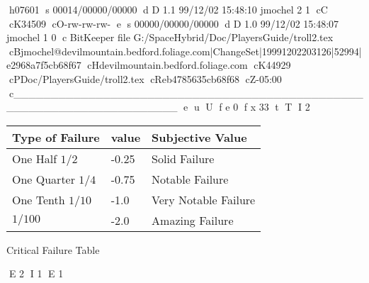 h07601
s 00014/00000/00000
d D 1.1 99/12/02 15:48:10 jmochel 2 1
cC
cK34509
cO-rw-rw-rw-
e
s 00000/00000/00000
d D 1.0 99/12/02 15:48:07 jmochel 1 0
c BitKeeper file G:/SpaceHybrid/Doc/PlayersGuide/troll2.tex
cBjmochel@devilmountain.bedford.foliage.com|ChangeSet|19991202203126|52994|e2968a7f5cb68f67
cHdevilmountain.bedford.foliage.com
cK44929
cPDoc/PlayersGuide/troll2.tex
cReb4785635cb68f68
cZ-05:00
c______________________________________________________________________
e
u
U
f e 0
f x 33
t
T
I 2
\begin{SHTable}[H]
	\begin{tabular}{l|l|l}
	Type of Failure				& value & Subjective Value	\\
	\hline
	One Half \( 1/2 \)			& -0.25	& Solid Failure		\\
        One Quarter \( 1/4 \) 	& -0.75	& Notable Failure	\\
        One Tenth \( 1/10 \) 	& -1.0	& Very Notable Failure	\\
        \(1/100\) 				& -2.0	& Amazing Failure	\\
    \end{tabular}
	\caption{Critical Failure Table}\label{Table:CriticalFailure}
\end{SHTable}

E 2
I 1
E 1
